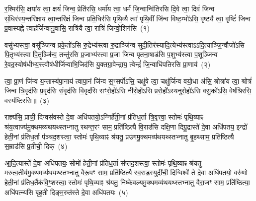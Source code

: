 {\anuvakamend[{सूर्य॑स्य॒ मनु॑षो मरुतः॒ पाव॑क॒ महो॑भी रथे॒शुभं॒ केन॒ षट्च॑त्वारिꣳशच्च}]}%


{\anuvakamend[{र॒श्मिर॑सि॒ राज्ञ्य॑स्य॒यं पु॒रो हरि॑केशो॒\-ऽग्निर्मू॒र्धेन्द्रा॒ग्निभ्यां॒ बृह॒स्पति॑र्भूय॒स्कृद॑स्य॒ग्निना॑ विश्वा॒षाट्प्र॒जा\-प॑ति॒र्मन॑सा॒ कृत्ति॑का॒ मधु॑श्च स॒मिद्दि॒शां द्वाद॑श}]}%
{}

\setcounter{anuvakam}{0}
र॒श्मिर॑सि॒ क्षया॑य त्वा॒ क्षयं॑ जिन्व॒ प्रेति॑रसि॒ धर्मा॑य त्वा॒ धर्मं॑ जि॒न्वान्वि॑तिरसि दि॒वे त्वा॒ दिवं॑ जिन्व सं॒धिर॑स्य॒न्तरि॑क्षाय त्वा॒न्तरि॑क्षं जिन्व प्रति॒धिर॑सि पृथि॒व्यै त्वा॑ पृथि॒वीं जि॑न्व विष्ट॒म्भो॑\-ऽसि॒ वृष्ट्यै᳚ त्वा॒ वृष्टिं॑ जिन्व प्र॒वास्यह्ने॒ त्वाह॑र्जिन्वानु॒वासि॒ रात्रि॑यै त्वा॒ रात्रिं॑ जिन्वो॒शिग॑सि~(१)

वसु॑भ्यस्त्वा॒ वसू᳚ञ्जिन्व प्रके॒तो॑\-ऽसि रु॒द्रेभ्य॑स्त्वा रु॒द्राञ्जि॑न्व सुदी॒तिर॑स्यादि॒त्येभ्य॑स्त्वा\-ऽ\-ऽदि॒त्याञ्जि॒न्वौजो॑\-ऽसि पि॒तृभ्य॑स्त्वा पि॒तॄञ्जि॑न्व॒ तन्तु॑रसि प्र॒जाभ्य॑स्त्वा प्र॒जा जि॑न्व पृतना॒षाड॑सि प॒शुभ्य॑स्त्वा प॒शूञ्जि॑न्व रे॒वद॒स्योष॑धीभ्य॒स्त्वौष॑धीर्जिन्वाभि॒जिद॑सि यु॒क्तग्रा॒वेन्द्रा॑य॒ त्वेन्द्रं॑ जि॒न्वाधि॑पतिरसि प्रा॒णाय॑~(२)

त्वा॒ प्रा॒णं जि॑न्व य॒न्तास्य॑पा॒नाय॑ त्वापा॒नं जि॑न्व स॒ꣳ॒सर्पो॑\-ऽसि॒ चक्षु॑षे त्वा॒ चक्षु॑र्जिन्व वयो॒धा अ॑सि॒ श्रोत्रा॑य त्वा॒ श्रोत्रं॑ जिन्व त्रि॒वृद॑सि प्र॒वृद॑सि सं॒वृद॑सि वि॒वृद॑सि सꣳरो॒हो॑\-ऽसि नीरो॒हो॑\-ऽसि प्ररो॒हो᳚\-ऽस्यनुरो॒हो॑\-ऽसि वसु॒को॑\-ऽसि॒ वेष॑श्रिरसि॒ वस्य॑ष्टिरसि॥~(३)

{\anuvakamend[{उ॒शिग॑सि प्रा॒णाय॒ त्रिच॑त्वारिꣳशच्च}]}%

राज्ञ्य॑सि॒ प्राची॒ दिग्वस॑वस्ते दे॒वा अधि॑पतयो॒\-ऽग्निर्\mbox{}हे॑ती॒नां प्र॑तिध॒र्ता त्रि॒वृत्त्वा॒ स्तोमः॑ पृथि॒व्याꣴ श्र॑य॒त्वाज्य॑मु॒क्थ\-मव्य॑थयथ्स्तभ्नातु रथन्त॒रꣳ साम॒ प्रति॑ष्ठित्यै वि॒राड॑सि दक्षि॒णा दिग्रु॒द्रास्ते॑ दे॒वा अधि॑पतय॒ इन्द्रो॑ हेती॒नां प्र॑तिध॒र्ता प॑ञ्चद॒शस्त्वा॒ स्तोमः॑ पृथि॒व्याꣴ श्र॑यतु॒ प्रउ॑गमु॒क्थमव्य॑थयथ्स्तभ्नातु बृ॒हथ्साम॒ प्रति॑ष्ठित्यै स॒म्राड॑सि प्र॒तीची॒ दिक्~(४)

आ॒दि॒त्यास्ते॑ दे॒वा अधि॑पतयः॒ सोमो॑ हेती॒नां प्र॑तिध॒र्ता स॑प्तद॒शस्त्वा॒ स्तोमः॑ पृथि॒व्याꣴ श्र॑यतु मरुत्व॒तीय॑मु॒क्थ\-मव्य॑थयथ्स्तभ्नातु वैरू॒पꣳ साम॒ प्रति॑ष्ठित्यै स्व॒राड॒स्युदी॑ची॒ दिग्विश्वे॑ ते दे॒वा अधि॑पतयो॒ वरु॑णो हेती॒नां प्र॑तिध॒र्तैक॑\-वि॒ꣳ॒शस्त्वा॒ स्तोमः॑ पृथि॒व्याꣴ श्र॑यतु॒ निष्के॑वल्यमु॒क्थमव्य॑थयथ्स्तभ्नातु वैरा॒जꣳ साम॒ प्रति॑ष्ठित्या॒ अधि॑पत्न्यसि बृह॒ती दिङ्म॒रुत॑स्ते दे॒वा अधि॑पतयः~(५)

